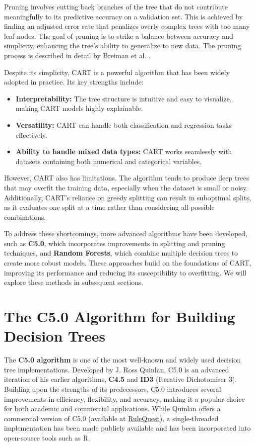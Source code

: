 \documentclass[
]{book}
\providecommand{\tightlist}{%
  \setlength{\itemsep}{0pt}\setlength{\parskip}{0pt}}
\theoremstyle{definition}
\theoremstyle{definition}
\theoremstyle{definition}
\theoremstyle{definition}
\theoremstyle{remark}
\begin{document}
Pruning involves cutting back branches of the tree that do not contribute meaningfully to its predictive accuracy on a validation set. This is achieved by finding an adjusted error rate that penalizes overly complex trees with too many leaf nodes. The goal of pruning is to strike a balance between accuracy and simplicity, enhancing the tree's ability to generalize to new data. The pruning process is described in detail by Breiman et al. \citep{breiman1984classification}.

Despite its simplicity, CART is a powerful algorithm that has been widely adopted in practice. Its key strengths include:

\begin{itemize}
\tightlist
\item
  \textbf{Interpretability:} The tree structure is intuitive and easy to visualize, making CART models highly explainable.\\
\item
  \textbf{Versatility:} CART can handle both classification and regression tasks effectively.\\
\item
  \textbf{Ability to handle mixed data types:} CART works seamlessly with datasets containing both numerical and categorical variables.
\end{itemize}

However, CART also has limitations. The algorithm tends to produce deep trees that may overfit the training data, especially when the dataset is small or noisy. Additionally, CART's reliance on greedy splitting can result in suboptimal splits, as it evaluates one split at a time rather than considering all possible combinations.

To address these shortcomings, more advanced algorithms have been developed, such as \textbf{C5.0}, which incorporates improvements in splitting and pruning techniques, and \textbf{Random Forests}, which combine multiple decision trees to create more robust models. These approaches build on the foundations of CART, improving its performance and reducing its susceptibility to overfitting. We will explore these methods in subsequent sections.

\section{The C5.0 Algorithm for Building Decision Trees}\label{the-c5.0-algorithm-for-building-decision-trees}

The \textbf{C5.0 algorithm} is one of the most well-known and widely used decision tree implementations. Developed by J. Ross Quinlan, C5.0 is an advanced iteration of his earlier algorithms, \textbf{C4.5} and \textbf{ID3} (Iterative Dichotomiser 3). Building upon the strengths of its predecessors, C5.0 introduces several improvements in efficiency, flexibility, and accuracy, making it a popular choice for both academic and commercial applications. While Quinlan offers a commercial version of C5.0 (available at \href{http://www.rulequest.com/}{RuleQuest}), a single-threaded implementation has been made publicly available and has been incorporated into open-source tools such as R.
\end{document}
